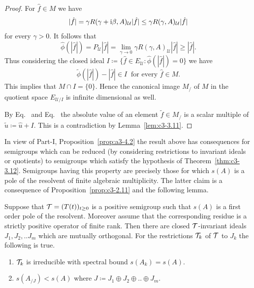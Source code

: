 \begin{proof}
For $\hat{f} \in M$ we have 
%
\[
	|\hat{f}| = \gamma R(\gamma+\im\beta,A)_{\mathcal{U}}|\hat{f}| \leq \gamma R(\gamma,A)_{\mathcal{U}}|\hat{f}|
\]
%
for every $\gamma > 0$.
It follows that 
%
\[
	\hat{\phi}(|\hat{f}|) = P_{\mathcal{U}}|\hat{f}| = \lim_{\gamma\to 0}\gamma R(\gamma,A)_{\mathcal{U}}|\hat{f}| \geq |\hat{f}| .
\]
%
Thus considering the closed ideal $I \coloneq \{\hat{f} \in E_{\mathcal{U}} \colon \hat{\phi}(|\hat{f}|) = 0\}$ we have
	\begin{equation}\label{eq:c3-3.17}
		\tilde{\phi}(|\hat{f}|) - |\hat{f}| \in I \ \text{ for every } \hat{f} \in M .
	\end{equation}
	This implies that $M \cap I = \{0\}$. 
	Hence the canonical image $M_/$ of\/ $M$ in the quotient space $E_{\mathcal{U}/{I}}$ is infinite dimensional as well. 
	
	By Eq.~ and Eq.~ the absolute value of an element $\tilde{f} \in M_/$ is a scalar multiple of\/ $\tilde{u} \coloneq \hat{u} + I$. 
	This is a contradiction by Lemma~\ref{lem:c3-3.11}.
\end{proof}
In view of Part-I, Proposition~\ref{prop:a3-4.2} the result above has consequences for semigroups which can be reduced (by considering restrictions to invariant ideals or quotients) to semigroups which satisfy the hypothesis of Theorem~\ref{thm:c3-3.12}. 
Semigroups having this property are precisely those for which $s(A)$ is a pole of the resolvent of finite algebraic multiplicity. 
The latter claim is a consequence of Proposition~\ref{prop:c3-2.11} and the following lemma.
\begin{lemma}\label{lem:c3-3.13}
	Suppose that $\TT = (T(t))_{t  \geq 0}$ is a positive semigroup such that $s(A)$ is a first order pole of the resolvent. 
	Moreover assume that the corresponding residue is a strictly positive operator of finite rank.
	Then there are closed $\mathcal{T}$-invariant ideals $J_{1},J_{2}, .. J_{m}$ which are mutually orthogonal. 
	For the restrictions  $\mathcal{T}_{k}$ of\/ $\mathcal{T}$ to $J_{k}$ the following is true.
	\begin{enumerate}[\upshape (i)]
		\item $\mathcal{T}_{k}$ is irreducible with spectral bound $s(A_k) = s(A)$. 
		\item $s(A_{/J}) < s(A)$  where $J \coloneq  J_{1}\oplus J_{2}\oplus .. \oplus J_{m} .$
	\end{enumerate}
\end{lemma}
